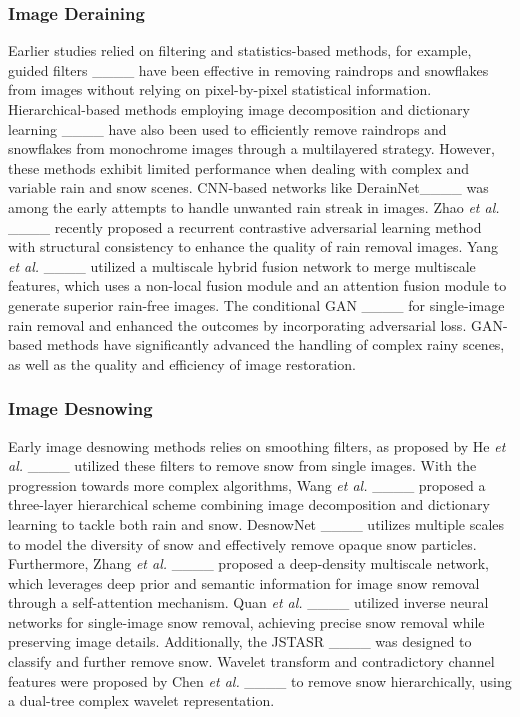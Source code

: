 \subsubsection{Image Deraining}
%
    Earlier studies relied on filtering and statistics-based methods, for example, guided filters ____ have been effective in removing raindrops and snowflakes from images without relying on pixel-by-pixel statistical information. Hierarchical-based methods employing image decomposition and dictionary learning ____ have also been used to efficiently remove raindrops and snowflakes from monochrome images through a multilayered strategy. However, these methods exhibit limited performance when dealing with complex and variable rain and snow scenes. CNN-based networks like DerainNet____ was among the early attempts to handle unwanted rain streak in images. Zhao \textit{et al.} ____ recently proposed a recurrent contrastive adversarial learning method with structural consistency to enhance the quality of rain removal images. Yang \textit{et al.} ____ utilized a multiscale hybrid fusion network to merge multiscale features, which uses a non-local fusion module and an attention fusion module to generate superior rain-free images. The conditional GAN ____ for single-image rain removal and enhanced the outcomes by incorporating adversarial loss. GAN-based methods have significantly advanced the handling of complex rainy scenes, as well as the quality and efficiency of image restoration.
%
\subsubsection{Image Desnowing}
%
    Early image desnowing methods relies on smoothing filters, as proposed by He \textit{et al.} ____ utilized these filters to remove snow from single images. With the progression towards more complex algorithms, Wang \textit{et al.} ____ proposed a three-layer hierarchical scheme combining image decomposition and dictionary learning to tackle both rain and snow. DesnowNet ____ utilizes multiple scales to model the diversity of snow and effectively remove opaque snow particles. Furthermore, Zhang \textit{et al.} ____ proposed a deep-density multiscale network, which leverages deep prior and semantic information for image snow removal through a self-attention mechanism. Quan \textit{et al.} ____ utilized inverse neural networks for single-image snow removal, achieving precise snow removal while preserving image details. Additionally, the JSTASR ____ was designed to classify and further remove snow. Wavelet transform and contradictory channel features were proposed by Chen \textit{et al.} ____ to remove snow hierarchically, using a dual-tree complex wavelet representation.
%

